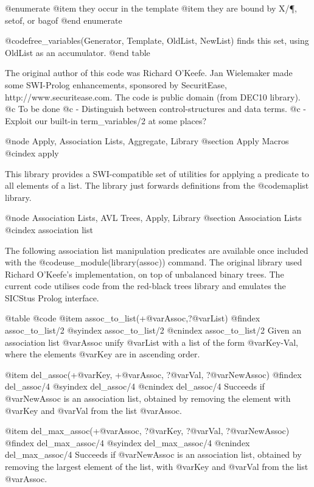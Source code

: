 @enumerate
@item they occur in the template
@item they are bound by X/\P, setof, or bagof
@end enumerate

    @code{free_variables(Generator, Template, OldList, NewList)} finds this set, using OldList as an accumulator.
@end table

The original author of this code was Richard O'Keefe. Jan Wielemaker
    made some SWI-Prolog enhancements, sponsored by SecuritEase,
    http://www.securitease.com. The code is public domain (from DEC10 library).
    @c To be done
    @c     - Distinguish between control-structures and data terms.
    @c     - Exploit our built-in term_variables/2 at some places? 



@node Apply, Association Lists, Aggregate, Library
@section   Apply Macros
@cindex apply

This library provides a SWI-compatible set of utilities for applying a
predicate to all elements of a list. The library just forwards
definitions from the @code{maplist} library.



@node Association Lists, AVL Trees, Apply, Library
@section Association Lists
@cindex association list

The following association list manipulation predicates are available
once included with the @code{use_module(library(assoc))} command. The
original library used Richard O'Keefe's implementation, on top of
unbalanced binary trees. The current code utilises code from the
red-black trees library and emulates the SICStus Prolog interface.

@table @code
@item assoc_to_list(+@var{Assoc},?@var{List})
@findex assoc_to_list/2
@syindex assoc_to_list/2
@cnindex assoc_to_list/2
Given an association list @var{Assoc} unify @var{List} with a list of
the form @var{Key-Val}, where the elements @var{Key} are in ascending
order.

@item del_assoc(+@var{Key}, +@var{Assoc}, ?@var{Val}, ?@var{NewAssoc})
@findex del_assoc/4
@syindex del_assoc/4
@cnindex del_assoc/4
Succeeds if @var{NewAssoc} is an association list, obtained by removing
the element with @var{Key} and @var{Val} from the list @var{Assoc}.

@item del_max_assoc(+@var{Assoc}, ?@var{Key}, ?@var{Val}, ?@var{NewAssoc})
@findex del_max_assoc/4
@syindex del_max_assoc/4
@cnindex del_max_assoc/4
Succeeds if @var{NewAssoc} is an association list, obtained by removing
the largest element of the list, with @var{Key} and @var{Val} from the
list @var{Assoc}.

